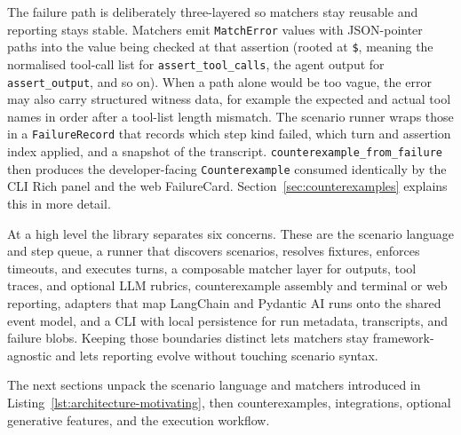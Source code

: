 The failure path is deliberately three-layered so matchers stay reusable and reporting stays stable. Matchers emit \texttt{MatchError} values with JSON-pointer paths into the value being checked at that assertion (rooted at \texttt{\$}, meaning the normalised tool-call list for \texttt{assert\_tool\_calls}, the agent output for \texttt{assert\_output}, and so on). When a path alone would be too vague, the error may also carry structured witness data, for example the expected and actual tool names in order after a tool-list length mismatch. The scenario runner wraps those in a \texttt{FailureRecord} that records which step kind failed, which turn and assertion index applied, and a snapshot of the transcript. \texttt{counterexample\_from\_failure} then produces the developer-facing \texttt{Counterexample} consumed identically by the CLI Rich panel and the web FailureCard. Section~\ref{sec:counterexamples} explains this in more detail.

At a high level the library separates six concerns. These are the scenario language and step queue, a runner that discovers scenarios, resolves fixtures, enforces timeouts, and executes turns, a composable matcher layer for outputs, tool traces, and optional LLM rubrics, counterexample assembly and terminal or web reporting, adapters that map LangChain and Pydantic AI runs onto the shared event model, and a CLI with local persistence for run metadata, transcripts, and failure blobs. Keeping those boundaries distinct lets matchers stay framework-agnostic and lets reporting evolve without touching scenario syntax.

The next sections unpack the scenario language and matchers introduced in Listing~\ref{lst:architecture-motivating}, then counterexamples, integrations, optional generative features, and the execution workflow.
